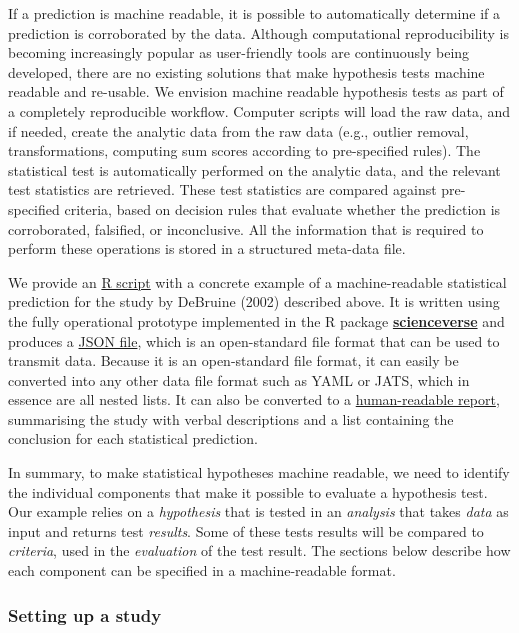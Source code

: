\documentclass[
  english,
  doc,floatsintext]{apa6}
\begin{document}
If a prediction is machine readable, it is possible to automatically determine if a prediction is corroborated by the data. Although computational reproducibility is becoming increasingly popular as user-friendly tools are continuously being developed, there are no existing solutions that make hypothesis tests machine readable and re-usable. We envision machine readable hypothesis tests as part of a completely reproducible workflow. Computer scripts will load the raw data, and if needed, create the analytic data from the raw data (e.g., outlier removal, transformations, computing sum scores according to pre-specified rules). The statistical test is automatically performed on the analytic data, and the relevant test statistics are retrieved. These test statistics are compared against pre-specified criteria, based on decision rules that evaluate whether the prediction is corroborated, falsified, or inconclusive. All the information that is required to perform these operations is stored in a structured meta-data file.

We provide an \href{example/main/example.Rmd}{R script} with a concrete example of a machine-readable statistical prediction for the study by DeBruine (2002) described above. It is written using the fully operational prototype implemented in the R package \href{https://scienceverse.github.io/scienceverse/}{\textbf{scienceverse}} and produces a \href{example/postreg.json}{JSON file}, which is an open-standard file format that can be used to transmit data. Because it is an open-standard file format, it can easily be converted into any other data file format such as YAML or JATS, which in essence are all nested lists. It can also be converted to a \href{example/postreg.html}{human-readable report}, summarising the study with verbal descriptions and a list containing the conclusion for each statistical prediction.

In summary, to make statistical hypotheses machine readable, we need to identify the individual components that make it possible to evaluate a hypothesis test. Our example relies on a \emph{hypothesis} that is tested in an \emph{analysis} that takes \emph{data} as input and returns test \emph{results}. Some of these tests results will be compared to \emph{criteria}, used in the \emph{evaluation} of the test result. The sections below describe how each component can be specified in a machine-readable format.

\hypertarget{setting-up-a-study}{%
\subsubsection{Setting up a study}\label{setting-up-a-study}}
\end{document}
